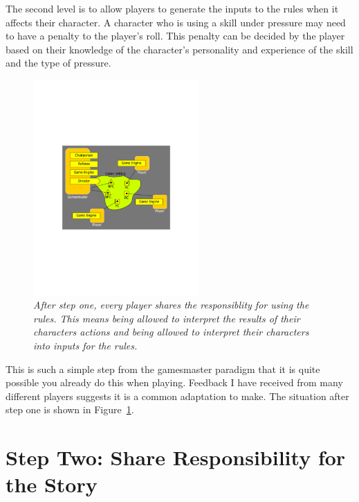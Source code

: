 \documentclass[twoside]{book}
\begin{document}
The second level is to allow players to generate the inputs to the rules when it affects their character. A character who is using a skill under pressure may need to have a penalty to the player's roll. This penalty can be decided by the player based on their knowledge of the character's personality and experience of the skill and the type of pressure.
\begin{figure}[!htb]
\centering
\includegraphics[width=2.5in]{collaborate_figure2}
\caption{\it After step one, every player shares the responsiblity for using the rules. This means being allowed to interpret the results of their characters actions and being allowed to interpret their characters into inputs for the rules.}
\label{players-interpret}
\end{figure}
This is such a simple step from the gamesmaster paradigm that it is quite possible you already do this when playing. Feedback I have received from many different players suggests it is a common adaptation to make. The situation after step one is shown in Figure~\ref{players-interpret}.

\section{Step Two: Share Responsibility for the Story}
\end{document}
